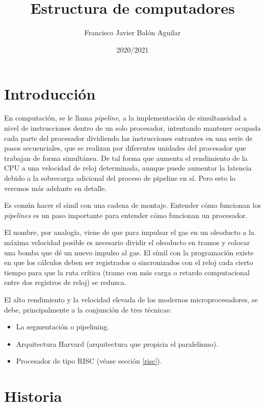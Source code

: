\documentclass[a4paper, 11pt, titlepage]{article}
\title{\textbf{\nombre}\\ {\normalsize \textbf{Estructura de computadores}}}
\author{Francisco Javier Balón Aguilar}
\date{2020/2021}
\begin{document}
\maketitle
\renewcommand{\contentsname}{Índice}
\tableofcontents
\newpage

\section{Introducción}

    En computación, se le llama \textit{pipeline}, a la implementación de simultaneidad a nivel de instrucciones 
    dentro de un solo procesador, intentando mantener ocupada cada parte del procesador dividiendo las instrucciones 
    entrantes en una serie de pasos secuenciales, que se realizan por diferentes unidades del procesador que trabajan 
    de forma simultánea. De tal forma que aumenta el rendimiento de la CPU a una velocidad de reloj determinada, 
    aunque puede aumentar la latencia debido a la sobrecarga adicional del proceso de pipeline en sí. Pero esto lo veremos 
    más adelante en detalle.
    
    Es común hacer el símil con una cadena de montaje. Entender cómo funcionan los \textit{pipelines} es un paso 
    importante para entender cómo funcionan un procesador.

    El nombre, por analogía, viene de que para impulsar el gas en un oleoducto a la máxima velocidad posible es necesario 
    dividir el oleoducto en tramos y colocar una bomba que dé un nuevo impulso al gas. El símil con la programación existe 
    en que los cálculos deben ser registrados o sincronizados con el reloj cada cierto tiempo para que la ruta crítica 
    (tramo con más carga o retardo computacional entre dos registros de reloj) se reduzca. 

    El alto rendimiento y la velocidad elevada de los modernos microprocesadores, se debe, principalmente a la conjunción 
    de tres técnicas:

    \begin{itemize}
        \item La segmentación o pipelining.
        \item Arquitectura Harvard (arquitectura que propicia el paralelismo).
        \item Procesador de tipo RISC (véase sección \ref{risc}).
    \end{itemize}

\section{Historia}
\end{document}
